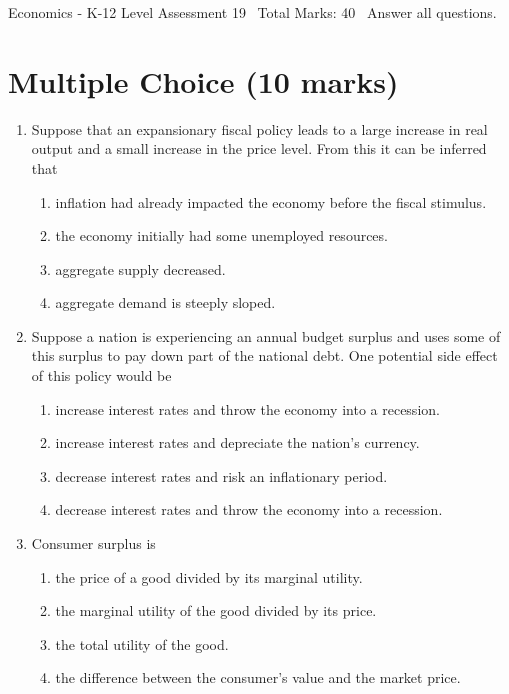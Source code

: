 \documentclass[12pt]{article}
\begin{document}
\begin{center}
Economics - K-12 Level Assessment 19 \
Total Marks: 40 \
Answer all questions.
\end{center}

\section*{Multiple Choice (10 marks)}
\begin{enumerate}[label=\arabic*.]
\item Suppose that an expansionary fiscal policy leads to a large increase in real output and a small increase in the price level. From this it can be inferred that
\begin{enumerate}[label=(\alph*)]
    \item inflation had already impacted the economy before the fiscal stimulus.
    \item the economy initially had some unemployed resources.
    \item aggregate supply decreased.
    \item aggregate demand is steeply sloped.
\end{enumerate}
\item Suppose a nation is experiencing an annual budget surplus and uses some of this surplus to pay down part of the national debt. One potential side effect of this policy would be
\begin{enumerate}[label=(\alph*)]
    \item increase interest rates and throw the economy into a recession.
    \item increase interest rates and depreciate the nation's currency.
    \item decrease interest rates and risk an inflationary period.
    \item decrease interest rates and throw the economy into a recession.
\end{enumerate}
\item Consumer surplus is
\begin{enumerate}[label=(\alph*)]
    \item the price of a good divided by its marginal utility.
    \item the marginal utility of the good divided by its price.
    \item the total utility of the good.
    \item the difference between the consumer's value and the market price.
\end{enumerate}

\end{enumerate}
\end{document}
